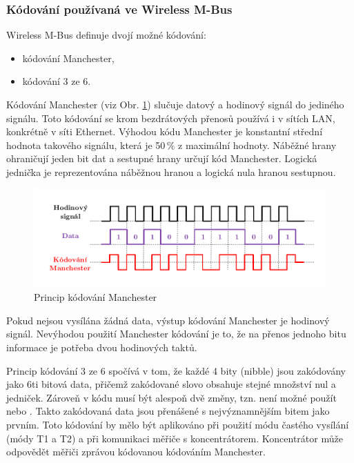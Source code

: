\subsubsection{Kódování používaná ve Wireless M-Bus}
Wireless M-Bus definuje dvojí možné kódování: 
\begin{itemize}
	\item kódování Manchester,
	\item kódování 3 ze 6. 
\end{itemize}

Kódování Manchester (viz Obr. \ref{ObrazekManechester}) slučuje datový a hodinový signál do jediného signálu. Toto kódování se krom bezdrátových přenosů používá i v sítích LAN, konkrétně v síti Ethernet. Výhodou kódu Manchester je konstantní střední hodnota takového signálu, která je 50\,\% z maximální hodnoty. Náběžné hrany ohraničují jeden bit dat a sestupné hrany určují kód Manchester. Logická jednička je reprezentována náběžnou hranou a logická nula hranou sestupnou. 

				\begin{figure}[!ht]
				\vspace{-20pt}
 \begin{center}
    \includegraphics[scale=1.0]{obrazky/wmbus_manchester}
  \end{center}
	\vspace{-40pt}
  \caption{Princip kódování Manchester}
	\label{ObrazekManechester}
	\vspace{-10pt}
\end{figure}

Pokud nejsou vysílána žádná data, výstup kódování Manchester je hodinový signál. Nevýhodou použití Manchester kódování je to, že na přenos jednoho bitu informace je potřeba dvou hodinových taktů.

Princip kódování 3 ze 6 spočívá v tom, že každé 4 bity (nibble) jsou zakódovány jako 6ti bitová data, přičemž zakódované slovo obsahuje stejné množství nul a jedniček. Zároveň v kódu musí být alespoň dvě změny, tzn. není možné použít  nebo . Takto zakódovaná data jsou přenášené s nejvýznamnějším bitem jako prvním. Toto kódování by mělo být aplikováno při použití módu častého vysílání (módy T1 a T2) a při komunikaci měřiče s koncentrátorem. Koncentrátor může odpovědět měřiči zprávou kódovanou kódováním Manchester.


